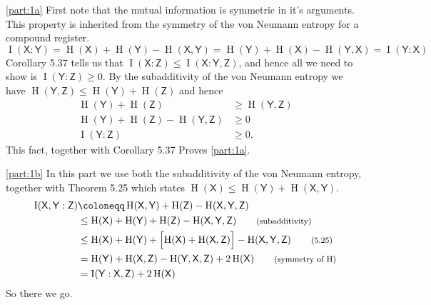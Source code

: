 \documentclass[boxes,pages,color=SeaGreen]{homework}
\newcommand{\reg}[1]{\mathsf{#1}}
\newcommand{\ent}{\operatorname{H}}
\newcommand{\mutIn}[2]{\operatorname{I}(#1 : #2)}
\newcommand{\smalltag}[1]{\tag*{\footnotesize (#1)}}
\begin{document}
\begin{solution}
    \ref{part:1a}
    First note that the mutual information is symmetric in it's arguments.
    This property is inherited from the symmetry of the von Neumann entropy for a compound register.
    \begin{equation*}
        \mutIn{\reg{X}}{\reg{Y}} = \ent(\reg{X}) + \ent(\reg{Y}) - \ent(\reg{X}, \reg{Y}) =  \ent(\reg{Y}) + \ent(\reg{X}) - \ent(\reg{Y}, \reg{X}) = \mutIn{\reg{Y}}{\reg{X}}
    \end{equation*}
    Corollary 5.37 tells us that $\mutIn{\reg{X}}{\reg{Z}} \leq \mutIn{\reg{X}}{\reg{Y},\reg{Z}}$, and hence all we need to show is $\mutIn{\reg{Y}}{\reg{Z}} \geq 0$.
    By the subadditivity of the von Neumann entropy we have $\ent(\reg{Y}, \reg{Z}) \leq \ent(\reg{Y}) + \ent(\reg{Z})$ and hence
    \begin{align*}
        \ent(\reg{Y}) + \ent(\reg{Z})                          & \geq \ent(\reg{Y}, \reg{Z}) \\
        \ent(\reg{Y}) + \ent(\reg{Z}) - \ent(\reg{Y}, \reg{Z}) & \geq 0                      \\
        \mutIn{\reg{Y}}{\reg{Z}}                               & \geq 0.
    \end{align*}
    This fact, together with Corollary 5.37 Proves \ref{part:1a}.

    \ref{part:1b}
    In this part we use both the subadditivity of the von Neumann entropy, together with Theorem 5.25 which states $\ent(\reg{X}) \leq \ent(\reg{Y}) + \ent(\reg{X}, \reg{Y})$.
    \begin{align*}
        \mutIn{\reg{X}, \reg{Y}}{\reg{Z}} & \defeq \ent(\reg{X}, \reg{Y}) + \ent(\reg{Z}) - \ent(\reg{X}, \reg{Y}, \reg{Z})                                                         \\
                                          & \leq \ent(\reg{X}) + \ent(\reg{Y}) + \ent(\reg{Z}) - \ent(\reg{X}, \reg{Y}, \reg{Z}) \smalltag{subadditivity}                           \\
                                          & \leq \ent(\reg{X}) + \ent(\reg{Y}) + \qty\Big[\ent(\reg{X}) + \ent(\reg{X}, \reg{Z})] - \ent(\reg{X}, \reg{Y}, \reg{Z}) \smalltag{5.25} \\
                                          & = \ent(\reg{Y}) + \ent(\reg{X}, \reg{Z}) - \ent(\reg{Y}, \reg{X}, \reg{Z}) + 2\ent(\reg{X}) \smalltag{symmetry of $\ent$}               \\
                                          & = \mutIn{\reg{Y}}{\reg{X},\reg{Z}} + 2\ent(\reg{X})
    \end{align*}
    So there we go.
\end{solution}
\end{document}
